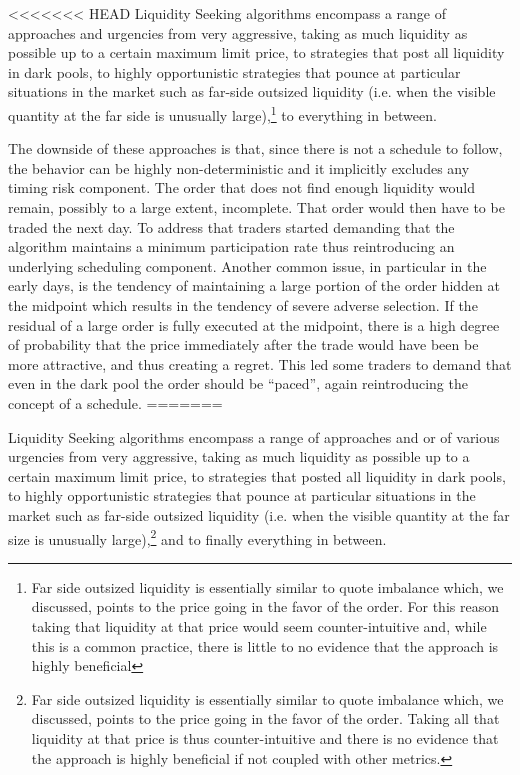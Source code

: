 <<<<<<< HEAD
Liquidity Seeking algorithms encompass a range of approaches and urgencies from very aggressive, taking as much liquidity as possible up to a certain maximum limit price, to strategies that post all liquidity in dark pools, to highly opportunistic strategies that pounce at particular situations in the market such as far-side outsized liquidity (i.e. when the visible quantity at the far side is unusually large),\footnote{Far side outsized liquidity is essentially similar to quote imbalance which, we discussed, points to the price going in the favor of the order. For this reason taking that liquidity at that price would seem counter-intuitive and, while this is a common practice,  there is little to no evidence that the approach is highly beneficial} to everything in between.


The downside of these approaches is that, since there is not a schedule to follow, the behavior can be highly non-deterministic and it implicitly excludes any timing risk component. The order that does not find enough liquidity would remain, possibly to a large extent, incomplete. That order would then have to be traded the next day. To address that traders started demanding that the algorithm maintains a minimum participation rate thus reintroducing an underlying scheduling component. Another common issue, in particular in the early days, is the tendency of maintaining a large portion of the order hidden at the midpoint which results in the tendency of severe  adverse selection. If the residual of a large order is fully executed at the midpoint, there is a high degree of probability that the price immediately after the trade would have been be more attractive, and thus creating a regret. This led some traders to demand that even in the dark pool the order should be ``paced'', again reintroducing the concept of a schedule.
=======

Liquidity Seeking algorithms encompass a range of approaches and or of various urgencies from very aggressive, taking as much liquidity as possible up to a certain maximum limit price, to strategies that posted all liquidity in dark pools, to highly opportunistic strategies that pounce at particular situations in the market such as far-side outsized liquidity (i.e. when the visible quantity at the far size is unusually large),\footnote{Far side outsized liquidity is essentially similar to quote imbalance which, we discussed, points to the price going in the favor of the order. Taking all that liquidity at that price is thus counter-intuitive and there is no evidence that the approach is highly beneficial if not coupled with other metrics.} and to finally everything in between.


